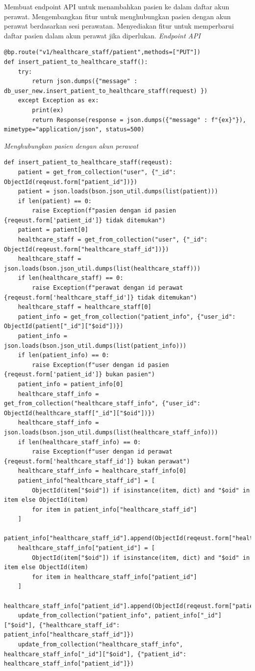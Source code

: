 \begin{enumerate}
Membuat endpoint API untuk menambahkan pasien ke dalam daftar akun perawat. Mengembangkan fitur untuk menghubungkan pasien dengan akun perawat berdasarkan sesi perawatan. Menyediakan fitur untuk memperbarui daftar pasien dalam akun perawat jika diperlukan.
\textit{Endpoint API}
\begin{lstlisting}
@bp.route("v1/healthcare_staff/patient",methods=["PUT"])
def insert_patient_to_healthcare_staff():
    try:
        return json.dumps({"message" : db_user_new.insert_patient_to_healthcare_staff(request) })
    except Exception as ex:
        print(ex)
        return Response(response = json.dumps({"message" : f"{ex}"}), mimetype="application/json", status=500)
\end{lstlisting}
\textit{Menghubungkan pasien dengan akun perawat}
\begin{lstlisting}
def insert_patient_to_healthcare_staff(reqeust):
    patient = get_from_collection("user", {"_id": ObjectId(reqeust.form["patient_id"])})
    patient = json.loads(bson.json_util.dumps(list(patient)))
    if len(patient) == 0:
        raise Exception(f"pasien dengan id pasien {reqeust.form['patient_id']} tidak ditemukan")
    patient = patient[0]
    healthcare_staff = get_from_collection("user", {"_id": ObjectId(reqeust.form["healthcare_staff_id"])})
    healthcare_staff = json.loads(bson.json_util.dumps(list(healthcare_staff)))
    if len(healthcare_staff) == 0:
        raise Exception(f"perawat dengan id perawat {reqeust.form['healthcare_staff_id']} tidak ditemukan")
    healthcare_staff = healthcare_staff[0]
    patient_info = get_from_collection("patient_info", {"user_id": ObjectId(patient["_id"]["$oid"])})
    patient_info = json.loads(bson.json_util.dumps(list(patient_info)))
    if len(patient_info) == 0:
        raise Exception(f"user dengan id pasien {reqeust.form['patient_id']} bukan pasien")
    patient_info = patient_info[0]
    healthcare_staff_info = get_from_collection("healthcare_staff_info", {"user_id": ObjectId(healthcare_staff["_id"]["$oid"])})
    healthcare_staff_info = json.loads(bson.json_util.dumps(list(healthcare_staff_info)))
    if len(healthcare_staff_info) == 0:
        raise Exception(f"user dengan id perawat {reqeust.form['healthcare_staff_id']} bukan perawat")
    healthcare_staff_info = healthcare_staff_info[0]
    patient_info["healthcare_staff_id"] = [
        ObjectId(item["$oid"]) if isinstance(item, dict) and "$oid" in item else ObjectId(item)
        for item in patient_info["healthcare_staff_id"]
    ]
    patient_info["healthcare_staff_id"].append(ObjectId(reqeust.form["healthcare_staff_id"]))
    healthcare_staff_info["patient_id"] = [
        ObjectId(item["$oid"]) if isinstance(item, dict) and "$oid" in item else ObjectId(item)
        for item in healthcare_staff_info["patient_id"]
    ]
    healthcare_staff_info["patient_id"].append(ObjectId(reqeust.form["patient_id"]))
    update_from_collection("patient_info", patient_info["_id"]["$oid"], {"healthcare_staff_id": patient_info["healthcare_staff_id"]})
    update_from_collection("healthcare_staff_info", healthcare_staff_info["_id"]["$oid"], {"patient_id": healthcare_staff_info["patient_id"]})


\end{lstlisting}
\end{enumerate}
